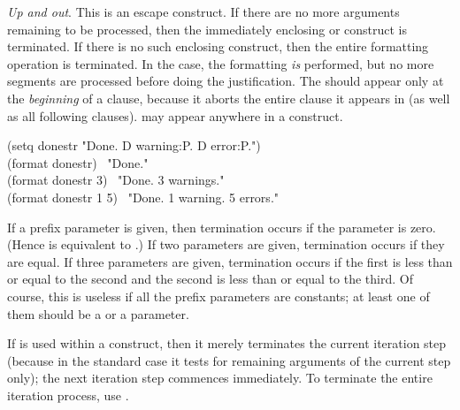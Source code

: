 \begin{flushdesc}
\item[\cd{{\Xtilde}{\Xcircumflex}}]
{\it Up and out}.
This is an escape construct.  If there are no more arguments remaining to
be processed, then the immediately enclosing \cd{{\Xtilde}{\Xlbrace}} or \cd{{\Xtilde}<} construct
is terminated.  If there is no such enclosing construct, then the entire
formatting operation is terminated.  In the \cd{{\Xtilde}<} case, the formatting
{\it is} performed, but no more segments are processed before doing the
justification.  The \cd{{\Xtilde}{\Xcircumflex}} should appear only at the {\it beginning} of a
\cd{{\Xtilde}<} clause, because it aborts the entire clause it appears in (as well
as all following clauses).
\cd{{\Xtilde}{\Xcircumflex}} may appear anywhere in a \cd{{\Xtilde}{\Xlbrace}}
construct.
\begin{lisp}
(setq donestr "Done.{\Xtilde}{\Xcircumflex}  {\Xtilde}D warning{\Xtilde}:P.{\Xtilde}{\Xcircumflex}  {\Xtilde}D error{\Xtilde}:P.") \\
(format {\false} donestr) \EV\ "Done." \\
(format {\false} donestr 3) \EV\ "Done.  3 warnings." \\
(format {\false} donestr 1 5) \EV\ "Done.  1 warning.  5 errors."
\end{lisp}

If a prefix parameter is given, then termination occurs if the parameter
is zero.  (Hence \cd{{\Xtilde}{\Xcircumflex}} is equivalent to \cd{{\Xtilde}\#{\Xcircumflex}}.)  If two
parameters are given, termination occurs if they are equal.  If three
parameters are given, termination occurs if the first is less than or
equal to the second and the second is less than or equal to the third.
Of course, this is useless if all the prefix parameters are constants; at
least one of them should be a \cd{\#} or a  parameter.

If \cd{{\Xtilde}{\Xcircumflex}} is used within a \cd{{\Xtilde}:{\Xlbrace}} construct, then it merely terminates
the current iteration step (because in the standard case it tests for
remaining arguments of the current step only); the next iteration step
commences immediately.  To terminate the entire iteration process,
use \cd{{\Xtilde}:{\Xcircumflex}}.


\end{flushdesc}
